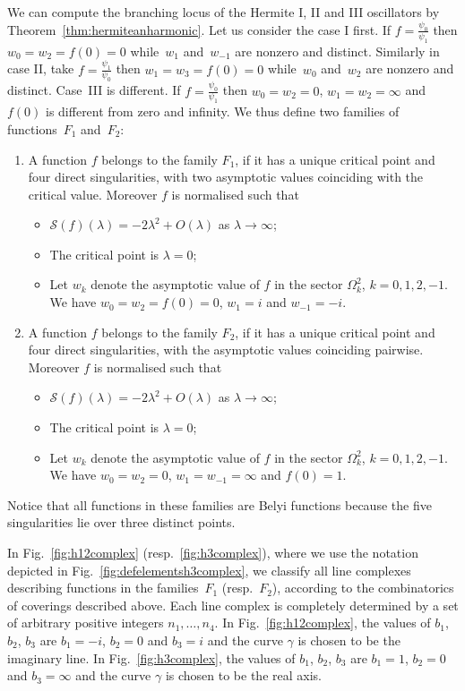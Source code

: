 \documentclass[pdftex]{sigma}
\numberwithin{equation}{section}
\newcommand{\la}{\lambda}
\begin{document}
We can compute the branching locus of the Hermite I, II and III oscillators by Theorem~\ref{thm:hermiteanharmonic}. Let us consider the case I f\/irst. If $f=\frac{\psi_0}{\psi_1}$ then $w_0=w_2=f(0)=0$ while~$w_1$ and~$w_{-1}$ are nonzero and distinct. Similarly in case II, take $f=\frac{\psi_1}{\psi_0}$ then $w_1=w_3=f(0)=0$ while~$w_0$ and~$w_{2}$ are nonzero and distinct. Case~III is dif\/ferent. If $f=\frac{\psi_0}{\psi_1}$ then $w_0=w_2=0$, $w_1 =w_2=\infty$ and~$f(0)$ is dif\/ferent from zero and inf\/inity. We thus def\/ine two families of functions~$F_1$ and~$F_2$:
\begin{enumerate}\itemsep=0pt
 \item A function $f$ belongs to the family $F_1$, if it has a unique critical point and four direct singularities, with two asymptotic values coinciding with the critical value. Moreover $f$ is normalised such that
 \begin{itemize}\itemsep=0pt
 \item $\mathcal{S}(f)(\la)=-2\la^2+O(\la)$ as $\la \to \infty $;
 \item The critical point is $\la=0$;
 \item Let $w_k$ denote the asymptotic value of $f$ in the sector $\Omega_k^2$, $k=0,1,2,-1$. We have $w_0=w_2=f(0)=0$, $w_1=i$ and $w_{-1}=-i$.
 \end{itemize}

 \item A function $f$ belongs to the family $F_2$, if it has a unique critical point and four direct singularities, with the asymptotic values coinciding pairwise.
 Moreover $f$ is normalised such that
 \begin{itemize}\itemsep=0pt
 \item $\mathcal{S}(f)(\la)=-2\la^2+O(\la)$ as $\la \to \infty $;
 \item The critical point is $\la=0$;
 \item Let $w_k$ denote the asymptotic value of $f$ in the sector $\Omega_k^2$, $k=0,1,2,-1$. We have $w_0=w_2=0$, $w_1=w_{-1}=\infty$ and $f(0)=1$.
 \end{itemize}
\end{enumerate}

Notice that all functions in these families are Belyi functions \cite{pibelyi} because the f\/ive singularities lie over three distinct points.

In Fig.~\ref{fig:h12complex} (resp.~\ref{fig:h3complex}), where we use the notation depicted in Fig.~\ref{fig:defelementsh3complex}, we classify all line complexes describing functions in the families~$F_1$ (resp.~$F_2$), according to the combinatorics of coverings described above. Each line complex is completely determined by a set of arbitrary positive integers $n_1,\dots,n_4$. In Fig.~\ref{fig:h12complex}, the values of $b_1$, $b_2$, $b_3$ are
$b_1=-i$, $b_2=0$ and $b_3=i$ and the curve $\gamma$ is chosen to be the imaginary line. In Fig.~\ref{fig:h3complex}, the values of $b_1$, $b_2$, $b_3$ are
$b_1=1$, $b_2=0$ and $b_3=\infty$ and the curve $\gamma$ is chosen to be the real axis.
\end{document}
